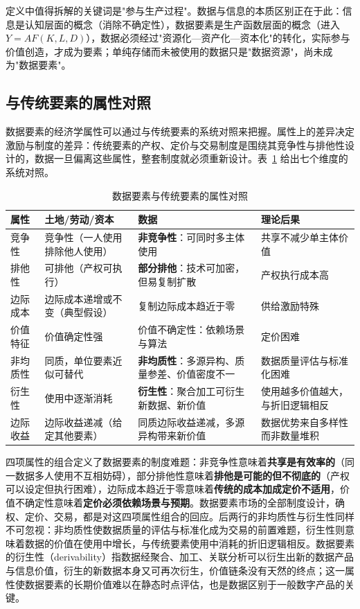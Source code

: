 定义中值得拆解的关键词是"参与生产过程"。数据与信息的本质区别正在于此：信息是认知层面的概念（消除不确定性），数据要素是生产函数层面的概念（进入 $Y = AF(K, L, D)$），数据必须经过"资源化—资产化—资本化"的转化，实际参与价值创造，才成为要素；单纯存储而未被使用的数据只是"数据资源"，尚未成为"数据要素"。

\subsection{与传统要素的属性对照}

数据要素的经济学属性可以通过与传统要素的系统对照来把握。属性上的差异决定激励与制度的差异：传统要素的产权、定价与交易制度是围绕其竞争性与排他性设计的，数据一旦偏离这些属性，整套制度就必须重新设计。表~\ref{tab:datafactor} 给出七个维度的系统对照。

\begin{table}[htbp]
\centering
\setlength{\tabcolsep}{4pt}
\caption{数据要素与传统要素的属性对照}
\label{tab:datafactor}
\begin{tabular}{p{2.2cm}p{3.9cm}p{3.9cm}p{2.2cm}}
\hline
\textbf{属性} & \textbf{土地/劳动/资本} & \textbf{数据} & \textbf{理论后果} \\
\hline
竞争性 & 竞争性（一人使用排除他人使用） & \textbf{非竞争性}：可同时多主体使用 & 共享不减少单主体价值 \\
排他性 & 可排他（产权可执行） & \textbf{部分排他}：技术可加密，但易复制扩散 & 产权执行成本高 \\
边际成本 & 边际成本递增或不变（典型假设） & 复制边际成本趋近于零 & 供给激励特殊 \\
价值特征 & 价值确定性强 & 价值不确定性：依赖场景与算法 & 定价困难 \\
非均质性 & 同质，单位要素近似可替代 & \textbf{非均质性}：多源异构、质量参差、价值密度不一 & 数据质量评估与标准化困难 \\
衍生性 & 使用中逐渐消耗 & \textbf{衍生性}：聚合加工可衍生新数据、新价值 & 使用越多价值越大，与折旧逻辑相反 \\
边际收益 & 边际收益递减（给定其他要素） & 同质边际收益递减，多源异构带来新价值 & 数据优势来自多样性而非数量堆积 \\
\hline
\end{tabular}
\end{table}

四项属性的组合定义了数据要素的制度难题：非竞争性意味着\textbf{共享是有效率的}（同一数据多人使用不互相妨碍），部分排他性意味着\textbf{排他是可能的但不彻底的}（产权可以设定但执行困难），边际成本趋近于零意味着\textbf{传统的成本加成定价不适用}，价值不确定性意味着\textbf{定价必须依赖场景与预期}。数据要素市场的全部制度设计，确权、定价、交易，都是对这四项属性组合的回应。后两行的非均质性与衍生性同样不可忽视：非均质性使数据质量的评估与标准化成为交易的前置难题，衍生性则意味着数据的价值在使用中增长，与传统要素使用中消耗的折旧逻辑相反。数据要素的衍生性（derivability）指数据经聚合、加工、关联分析可以衍生出新的数据产品与信息价值，衍生的新数据本身又可再次衍生，价值链条没有天然的终点；这一属性使数据要素的长期价值难以在静态时点评估，也是数据区别于一般数字产品的关键。

